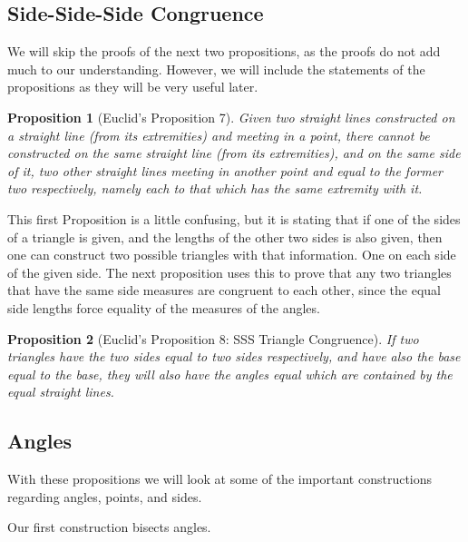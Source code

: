 \documentclass[
]{book}
\newtheorem{proposition}{Proposition}[chapter]
\theoremstyle{definition}
\theoremstyle{definition}
\theoremstyle{definition}
\theoremstyle{definition}
\theoremstyle{remark}
\begin{document}
\hypertarget{side-side-side-congruence}{%
\subsection{Side-Side-Side Congruence}\label{side-side-side-congruence}}

We will skip the proofs of the next two propositions, as the proofs do not add much to our understanding. However, we will include the statements of the propositions as they will be very useful later.

\begin{proposition}[Euclid's Proposition 7]
\protect\hypertarget{prp:prop7}{}\label{prp:prop7}Given two straight lines constructed on a straight line (from its extremities) and meeting in a point, there cannot be constructed on the same straight line (from its extremities), and on the same side of it, two other straight lines meeting in another point and equal to the former two respectively, namely each to that which has the same extremity with it.
\end{proposition}

This first Proposition is a little confusing, but it is stating that if one of the sides of a triangle is given, and the lengths of the other two sides is also given, then one can construct two possible triangles with that information. One on each side of the given side. The next proposition uses this to prove that any two triangles that have the same side measures are congruent to each other, since the equal side lengths force equality of the measures of the angles.

\begin{proposition}[Euclid's Proposition 8: SSS Triangle Congruence]
\protect\hypertarget{prp:prop8}{}\label{prp:prop8}If two triangles have the two sides equal to two sides respectively, and have also the base equal to the base, they will also have the angles equal which are contained by the equal straight lines.
\end{proposition}

\hypertarget{angles}{%
\subsection{Angles}\label{angles}}

With these propositions we will look at some of the important constructions regarding angles, points, and sides.

Our first construction bisects angles.
\end{document}
